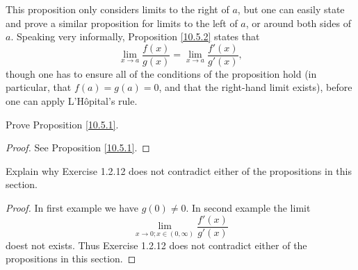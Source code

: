 \begin{remark}\label{10.5.3}
    This proposition only considers limits to the right of \(a\), but one can easily state and prove a similar proposition for limits to the left of \(a\), or around both sides of \(a\).
    Speaking very informally, Proposition \ref{10.5.2} states that
    \[
        \lim_{x \to a} \frac{f(x)}{g(x)} = \lim_{x \to a} \frac{f'(x)}{g'(x)},
    \]
    though one has to ensure all of the conditions of the proposition hold (in particular, that \(f(a) = g(a) = 0\), and that the right-hand limit exists), before one can apply L'Hôpital's rule.
\end{remark}

\exercisesection

\begin{exercise}\label{ex 10.5.1}
    Prove Proposition \ref{10.5.1}.
\end{exercise}

\begin{proof}
    See Proposition \ref{10.5.1}.
\end{proof}

\begin{exercise}\label{ex 10.5.2}
    Explain why Exercise 1.2.12 does not contradict either of the propositions in this section.
\end{exercise}

\begin{proof}
    In first example we have \(g(0) \neq 0\).
    In second example the limit
    \[
        \lim_{x \to 0 ; x \in (0, \infty)} \frac{f'(x)}{g'(x)}
    \]
    doest not exists.
    Thus Exercise 1.2.12 does not contradict either of the propositions in this section.
\end{proof}